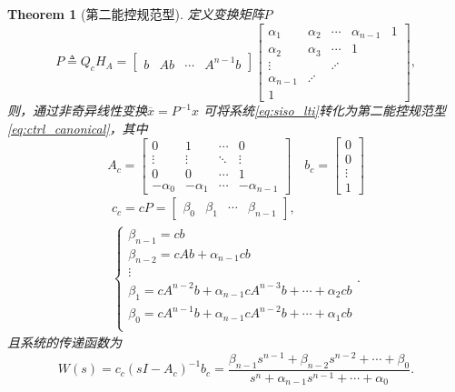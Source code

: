 \documentclass[14pt,a4paper]{article}
\theoremstyle{plain}
\newtheorem{thm}{Theorem}[section]
\theoremstyle{definition}
\theoremstyle{remark}
\theoremstyle{plain}
\theoremstyle{plain}
\theoremstyle{plain}
\theoremstyle{definition}
\theoremstyle{remark}
\numberwithin{equation}{section}
\begin{document}
				\begin{thm}[第二能控规范型]  
				\label{the:第二能控规范型} 
					定义变换矩阵$P$ 
					\[
					P \triangleq Q_c H_A = \begin{bmatrix}
						b & Ab & \cdots & A^{n-1}b 
					\end{bmatrix} \begin{bmatrix} 
						\alpha_1 & \alpha_2 & \cdots  & \alpha_{n-1} & 1 \\
						\alpha_2 & \alpha_3 & \cdots & 1 \\
						\vdots & & \iddots \\
						\alpha_{n-1} & \iddots \\
						1
					\end{bmatrix} 
					,\]
					则，通过非奇异线性变换$\overline{x}=P^{-1}x$ 可将系统\eqref{eq:siso_lti}转化为第二能控规范型\eqref{eq:ctrl_canonical}，其中
					\begin{equation}
					\label{eq:ctrl_canonical_2_Ab}
						A_c = \begin{bmatrix}
							0 & 1& \cdots & 0\\ 
							\vdots &\vdots&\ddots&\vdots \\ 
							0 & 0& \cdots &1 \\ 
							-\alpha_0 & -\alpha_1 & \cdots  & -\alpha_{n-1}
						\end{bmatrix} \quad 
						b_c = \begin{bmatrix}
							0 \\ 
							0 \\ 
							\vdots\\
							1
						\end{bmatrix} 
					\end{equation} 
					\begin{equation}
					\label{eq:ctrl_canonical_2_c}
					\begin{aligned}
						c_c = cP = \begin{bmatrix}
							\beta_0 & \beta_1 & \cdots & \beta_{n-1}
						\end{bmatrix},\\ 
						\begin{cases}
							\beta_{n-1} = c b \\ 
							\beta_{n-2} = cAb + \alpha_{n-1}c b\\
							\vdots \\ 
							\beta_1 = cA^{n-2}b + \alpha_{n-1}cA^{n-3}b + \cdots +\alpha_2c b\\
							\beta_0 = cA^{n-1}b + \alpha_{n-1}cA^{n-2}b + \cdots +\alpha_1 c b\\
						\end{cases}. 
					\end{aligned}  
					\end{equation} 
					且系统的传递函数为
					\[
						W(s) = c_c(sI-A_c)^{-1}b_c = \dfrac{\beta_{n-1}s^{n-1}+\beta_{n-2}s^{n-2}+ \cdots +\beta_0}{s^{n}+\alpha_{n-1}s^{n-1}+\cdots +\alpha_0} 
					.\] 
				\end{thm} 
\end{document}
